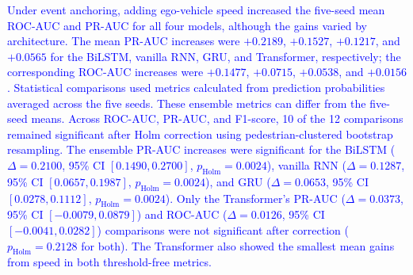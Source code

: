 \documentclass[mti,article,submit,moreauthors]{Definitions/mdpi}
\begin{document}

\textcolor{blue}{Under event anchoring, adding ego-vehicle speed increased the five-seed mean ROC-AUC and PR-AUC for all four models, although the gains varied by architecture. The mean PR-AUC increases were $+0.2189$, $+0.1527$, $+0.1217$, and $+0.0565$ for the BiLSTM, vanilla RNN, GRU, and Transformer, respectively; the corresponding ROC-AUC increases were $+0.1477$, $+0.0715$, $+0.0538$, and $+0.0156$. Statistical comparisons used metrics calculated from prediction probabilities averaged across the five seeds. These ensemble metrics can differ from the five-seed means. Across ROC-AUC, PR-AUC, and F1-score, 10 of the 12 comparisons remained significant after Holm correction using pedestrian-clustered bootstrap resampling. The ensemble PR-AUC increases were significant for the BiLSTM ($\Delta=0.2100$, 95\% CI $[0.1490,0.2700]$, $p_{\mathrm{Holm}}=0.0024$), vanilla RNN ($\Delta=0.1287$, 95\% CI $[0.0657,0.1987]$, $p_{\mathrm{Holm}}=0.0024$), and GRU ($\Delta=0.0653$, 95\% CI $[0.0278,0.1112]$, $p_{\mathrm{Holm}}=0.0024$). Only the Transformer's PR-AUC ($\Delta=0.0373$, 95\% CI $[-0.0079,0.0879]$) and ROC-AUC ($\Delta=0.0126$, 95\% CI $[-0.0041,0.0282]$) comparisons were not significant after correction ($p_{\mathrm{Holm}}=0.2128$ for both). The Transformer also showed the smallest mean gains from speed in both threshold-free metrics.}
\end{document}

